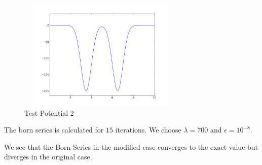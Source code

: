 \documentclass[a4paper,10pt]{report}
\begin{document}
\begin{figure}[hb]
\centering
\includegraphics[width=225pt, height=150pt]{potential1d2.png}
\caption[\textwidth]{Test Potential 2}
\end{figure}


The born series is calculated for $15$ iterations. We choose $\lambda=700$ and $\epsilon=10^{-8}$.

We see that the Born Series in the modified case converges to the exact value but diverges in the original case.



\end{document}
